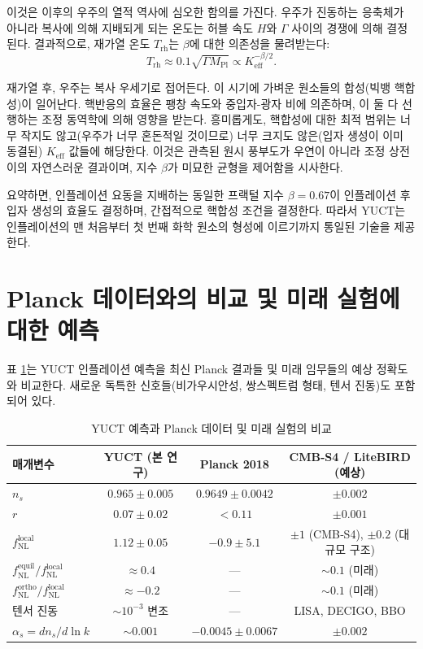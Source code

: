 \documentclass[11pt,a4paper]{article}
\newcommand{\Keff}{K_{\mathrm{eff}}}
\newcommand{\rs}{r}
\begin{document}
	이것은 이후의 우주의 열적 역사에 심오한 함의를 가진다. 우주가 진동하는 응축체가 아니라 복사에 의해 지배되게 되는 온도는 허블 속도 \(H\)와 \(\Gamma\) 사이의 경쟁에 의해 결정된다. 결과적으로, 재가열 온도 \(T_{\mathrm{rh}}\)는 \(\beta\)에 대한 의존성을 물려받는다:
	\begin{equation}
		T_{\mathrm{rh}} \approx 0.1 \sqrt{\Gamma M_{\mathrm{Pl}}} \propto \Keff^{-\beta/2}.
		\label{eq:trh}
	\end{equation}
	
	재가열 후, 우주는 복사 우세기로 접어든다. 이 시기에 가벼운 원소들의 합성(빅뱅 핵합성)이 일어난다. 핵반응의 효율은 팽창 속도와 중입자-광자 비에 의존하며, 이 둘 다 선행하는 조정 동역학에 의해 영향을 받는다. 흥미롭게도, 핵합성에 대한 최적 범위는 너무 작지도 않고(우주가 너무 혼돈적일 것이므로) 너무 크지도 않은(입자 생성이 이미 동결된) \(\Keff\) 값들에 해당한다. 이것은 관측된 원시 풍부도가 우연이 아니라 조정 상전이의 자연스러운 결과이며, 지수 \(\beta\)가 미묘한 균형을 제어함을 시사한다.
	
	요약하면, 인플레이션 요동을 지배하는 동일한 프랙털 지수 \(\beta = 0.67\)이 인플레이션 후 입자 생성의 효율도 결정하며, 간접적으로 핵합성 조건을 결정한다. 따라서 YUCT는 인플레이션의 맨 처음부터 첫 번째 화학 원소의 형성에 이르기까지 통일된 기술을 제공한다.
	
	\section{Planck 데이터와의 비교 및 미래 실험에 대한 예측}
	\label{sec:comparison}
	
	표 \ref{tab:comparison}는 YUCT 인플레이션 예측을 최신 Planck 결과들 및 미래 임무들의 예상 정확도와 비교한다. 새로운 독특한 신호들(비가우시안성, 쌍스펙트럼 형태, 텐서 진동)도 포함되어 있다.
	
	\begin{table}[htbp]
		\centering
		\caption{YUCT 예측과 Planck 데이터 및 미래 실험의 비교}
		\label{tab:comparison}
		\begin{tabular}{lccc}
			\toprule
			\textbf{매개변수} & \textbf{YUCT (본 연구)} & \textbf{Planck 2018} & \textbf{CMB‑S4 / LiteBIRD (예상)} \\
			\midrule
			\(n_s\) & \(0.965 \pm 0.005\) & \(0.9649 \pm 0.0042\) & \(\pm 0.002\) \\
			\(\rs\) & \(0.07 \pm 0.02\) & \(<0.11\) & \(\pm 0.001\) \\
			\(f_{\mathrm{NL}}^{\mathrm{local}}\) & \(1.12 \pm 0.05\) & \(-0.9 \pm 5.1\) & \(\pm 1\) (CMB‑S4), \(\pm 0.2\) (대규모 구조) \\
			\(f_{\mathrm{NL}}^{\mathrm{equil}} / f_{\mathrm{NL}}^{\mathrm{local}}\) & \(\approx 0.4\) & — & \(\sim 0.1\) (미래) \\
			\(f_{\mathrm{NL}}^{\mathrm{ortho}} / f_{\mathrm{NL}}^{\mathrm{local}}\) & \(\approx -0.2\) & — & \(\sim 0.1\) (미래) \\
			텐서 진동 & \( \sim 10^{-3}\) 변조 & — & LISA, DECIGO, BBO \\
			\(\alpha_s = dn_s/d\ln k\) & \(\sim 0.001\) & \(-0.0045 \pm 0.0067\) & \(\pm 0.002\) \\
			\bottomrule
		\end{tabular}
	\end{table}
	
\end{document}
